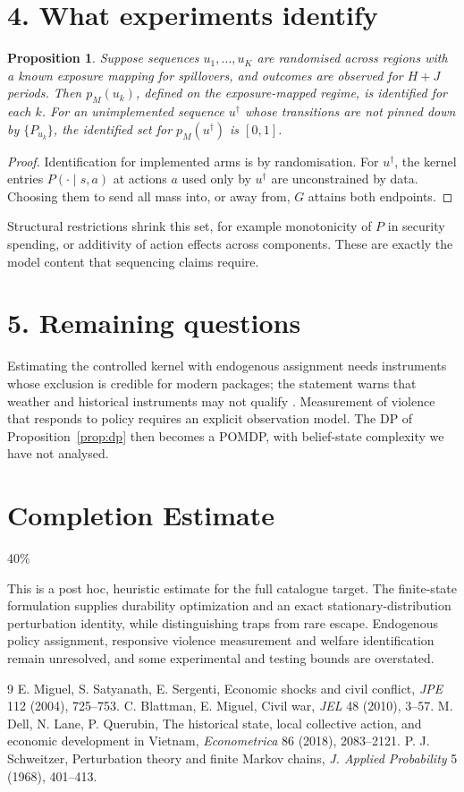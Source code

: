 \documentclass[11pt]{article}
\newtheorem{proposition}[theorem]{Proposition}
\theoremstyle{definition}
\begin{document}
\section*{4. What experiments identify}
\begin{proposition}\label{prop:exp}
Suppose sequences $u_1,\dots,u_K$ are randomised across regions with a known exposure mapping for spillovers, and outcomes
are observed for $H+J$ periods. Then $p_M(u_k)$, defined on the exposure-mapped regime, is identified for each $k$. For an
unimplemented sequence $u^\dagger$ whose transitions are not pinned down by $\{P_{u_k}\}$, the identified set for
$p_M(u^\dagger)$ is $[0,1]$.
\end{proposition}
\begin{proof}
Identification for implemented arms is by randomisation. For $u^\dagger$, the kernel entries $P(\cdot\mid s,a)$ at actions
$a$ used only by $u^\dagger$ are unconstrained by data. Choosing them to send all mass into, or away from, $G$ attains both
endpoints.
\end{proof}
Structural restrictions shrink this set, for example monotonicity of $P$ in security spending, or additivity of action
effects across components. These are exactly the model content that sequencing claims require.

\section*{5. Remaining questions}
Estimating the controlled kernel with endogenous assignment needs instruments whose exclusion is credible for modern
packages; the statement warns that weather and historical instruments may not qualify \cite{mss,bm,dlq}. Measurement of
violence that responds to policy requires an explicit observation model. The DP of Proposition~\ref{prop:dp} then becomes a
POMDP, with belief-state complexity we have not analysed.

\section{Completion Estimate}
40\%

This is a post hoc, heuristic estimate for the full catalogue target.
The finite-state formulation supplies durability optimization and an exact stationary-distribution perturbation identity, while distinguishing traps from rare escape. Endogenous policy assignment, responsive violence measurement and welfare identification remain unresolved, and some experimental and testing bounds are overstated.

\begin{thebibliography}{9}
 E. Miguel, S. Satyanath, E. Sergenti, Economic shocks and civil conflict, \emph{JPE} 112 (2004), 725--753.
 C. Blattman, E. Miguel, Civil war, \emph{JEL} 48 (2010), 3--57.
 M. Dell, N. Lane, P. Querubin, The historical state, local collective action, and economic development in Vietnam, \emph{Econometrica} 86 (2018), 2083--2121.
 P. J. Schweitzer, Perturbation theory and finite Markov chains, \emph{J. Applied Probability} 5 (1968), 401--413.
\end{thebibliography}
\end{document}
